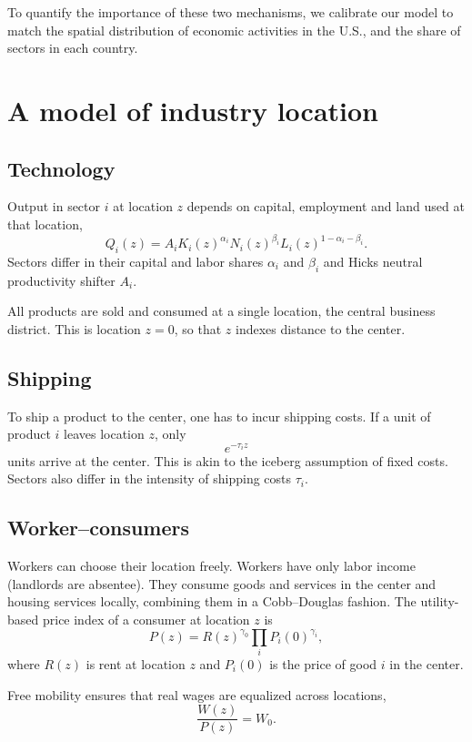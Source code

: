 \documentclass[12pt]{article}
\begin{document}
To quantify the importance of these two mechanisms, we calibrate our model to match the spatial distribution of economic activities in the U.S., and the share of sectors in each country.

\section{A model of industry location}
\subsection{Technology}
Output in sector $i$ at location $z$ depends on capital, employment and land used at that location,
\[
Q_i(z) = A_i K_i(z)^{\alpha_i}N_i(z)^{\beta_i}L_i(z)^{1-\alpha_i-\beta_i}.
\]
Sectors differ in their capital and labor shares $\alpha_i$ and $\beta_i$ and Hicks neutral productivity shifter $A_i$.

All products are sold and consumed at a single location, the central business district. This is location $z=0$, so that $z$ indexes distance to the center.

\subsection{Shipping}
To ship a product to the center, one has to incur shipping costs. If a unit of product $i$ leaves location $z$, only
\[
e^{-\tau_i z}
\]
units arrive at the center. This is akin to the iceberg assumption of fixed costs. Sectors also differ in the intensity of shipping costs $\tau_i$.

\subsection{Worker--consumers}
Workers can choose their location freely. Workers have only labor income (landlords are absentee). They consume goods and services in the center and housing services locally, combining them in a Cobb--Douglas fashion. The utility-based price index of a consumer at location $z$ is
\[
P(z) = R(z)^{\gamma_0}\prod_{i}P_i(0)^{\gamma_i},
\]
where $R(z)$ is rent at location $z$ and $P_i(0)$ is the price of good $i$ in the center.

Free mobility ensures that real wages are equalized across locations,
\[
\frac{W(z)}{P(z)} = W_0.
\]
\end{document}
